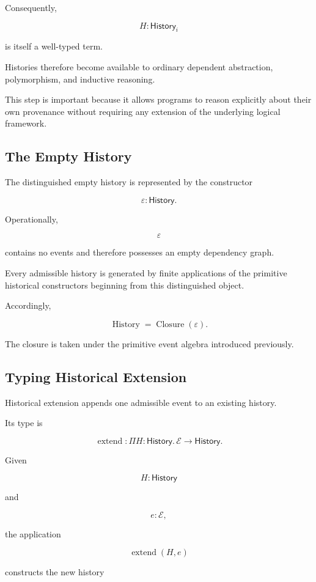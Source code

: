 \documentclass[12pt,oneside]{article}
\theoremstyle{definition}
\theoremstyle{remark}
\newcommand{\Event}{\mathcal{E}}
\DeclareMathOperator{\History}{History}
\begin{document}
Consequently,

\[
H : \mathsf{History}_i
\]

is itself a well-typed term.

Histories therefore become available to ordinary dependent abstraction,
polymorphism, and inductive reasoning.

This step is important because it allows programs to reason explicitly about
their own provenance without requiring any extension of the underlying logical
framework.

\subsection{The Empty History}

The distinguished empty history is represented by the constructor

\[
\varepsilon
:
\mathsf{History}.
\]

Operationally,

\[
\varepsilon
\]

contains no events and therefore possesses an empty dependency graph.

Every admissible history is generated by finite applications of the primitive
historical constructors beginning from this distinguished object.

Accordingly,

\[
\History
=
\operatorname{Closure}
(
\varepsilon
).
\]

The closure is taken under the primitive event algebra introduced previously.

\subsection{Typing Historical Extension}

Historical extension appends one admissible event to an existing history.

Its type is

\[
\operatorname{extend}
:
\Pi
H:\mathsf{History}.
\,
\Event
\rightarrow
\mathsf{History}.
\]

Given

\[
H
:
\mathsf{History}
\]

and

\[
e
:
\Event,
\]

the application

\[
\operatorname{extend}(H,e)
\]

constructs the new history
\end{document}
